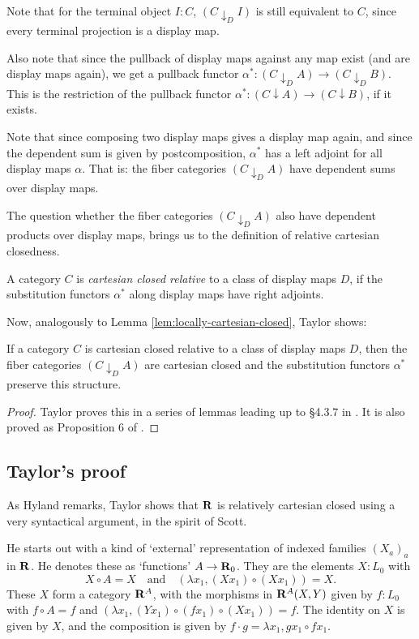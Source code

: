 Note that for the terminal object $ I : C $, $ (C \downarrow_D I) $ is still equivalent to $ C $, since every terminal projection is a display map.

Also note that since the pullback of display maps against any map exist (and are display maps again), we get a pullback functor $ \alpha^*: (C \downarrow_D A) \to (C \downarrow_D B) $. This is the restriction of the pullback functor $ \alpha^*: (C \downarrow A) \to (C \downarrow B) $, if it exists.

Note that since composing two display maps gives a display map again, and since the dependent sum is given by postcomposition, $ \alpha^* $ has a left adjoint for all display maps $ \alpha $. That is: the fiber categories $ (C \downarrow_D A) $ have dependent sums over display maps.

The question whether the fiber categories $ (C \downarrow_D A) $ also have dependent products over display maps, brings us to the definition of relative cartesian closedness.
\begin{definition}
  A category $ C $ is \textit{cartesian closed relative} to a class of display maps $ D $, if the substitution functors $ \alpha^* $ along display maps have right adjoints.
\end{definition}

Now, analogously to Lemma \ref{lem:locally-cartesian-closed}, Taylor shows:
\begin{lemma}
  If a category $ C $ is cartesian closed relative to a class of display maps $ D $, then the fiber categories $ (C \downarrow_D A) $ are cartesian closed and the substitution functors $ \alpha^* $ preserve this structure.
\end{lemma}
\begin{proof}
  Taylor proves this in a series of lemmas leading up to \S 4.3.7 in \autocite{taylor}. It is also proved as Proposition 6 of \autocite{theory-of-constructions}.
\end{proof}

\subsection{Taylor's proof}

As Hyland remarks, Taylor shows that $ \mathbf{R} $ is relatively cartesian closed using a very syntactical argument, in the spirit of Scott.

He starts out with a kind of `external' representation of indexed families $ (X_a)_a $ in $ \mathbf{R} $. He denotes these as `functions' $ A \to \mathbf{R}_0 $. They are the elements $ X: L_0 $ with
\[ X \circ A = X \quad \text{and} \quad (\lambda x_1, (X x_1) \circ (X x_1)) = X. \]
These $ X $ form a category $ \mathbf{R}^A $, with the morphisms in $ \mathbf{R}^A(X, Y) $ given by $ f: L_0 $ with $ f \circ A = f $ and $ (\lambda x_1, (Y x_1) \circ (f x_1) \circ (X x_1)) = f $. The identity on $ X $ is given by $ X $, and the composition is given by $ f \cdot g = \lambda x_1, g x_1 \circ f x_1 $.

